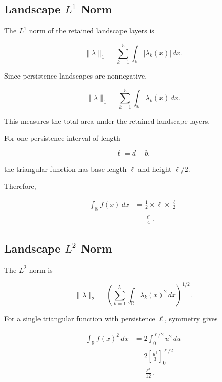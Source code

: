 \documentclass[oneside,english,11pt]{article}
\renewcommand{\boxed}[1]{#1}
\begin{document}
\subsection{Landscape $L^1$ Norm}

The $L^1$ norm of the retained landscape layers is

\begin{equation}
\boxed{
\|\lambda\|_1
=
\sum_{k=1}^{5}
\int_{\mathbb{R}}
|\lambda_k(x)|\,dx.
}
\end{equation}

Since persistence landscapes are nonnegative,

\begin{equation}
\|\lambda\|_1
=
\sum_{k=1}^{5}
\int_{\mathbb{R}}
\lambda_k(x)\,dx.
\end{equation}

This measures the total area under the retained
landscape layers.

For one persistence interval of length

\begin{equation}
\ell=d-b,
\end{equation}

the triangular function has base length $\ell$
and height $\ell/2$.

Therefore,

\begin{align}
\int_{\mathbb{R}}f(x)\,dx
&=
\frac{1}{2}
\times\ell
\times\frac{\ell}{2}
\\
&=
\boxed{\frac{\ell^2}{4}}.
\end{align}

\subsection{Landscape $L^2$ Norm}

The $L^2$ norm is

\begin{equation}
\boxed{
\|\lambda\|_2
=
\left(
\sum_{k=1}^{5}
\int_{\mathbb{R}}
\lambda_k(x)^2\,dx
\right)^{1/2}.
}
\end{equation}

For a single triangular function with persistence
$\ell$, symmetry gives

\begin{align}
\int_{\mathbb{R}}f(x)^2\,dx
&=
2\int_0^{\ell/2}u^2\,du
\\
&=
2\left[
\frac{u^3}{3}
\right]_0^{\ell/2}
\\
&=
\frac{\ell^3}{12}.
\end{align}
\end{document}
